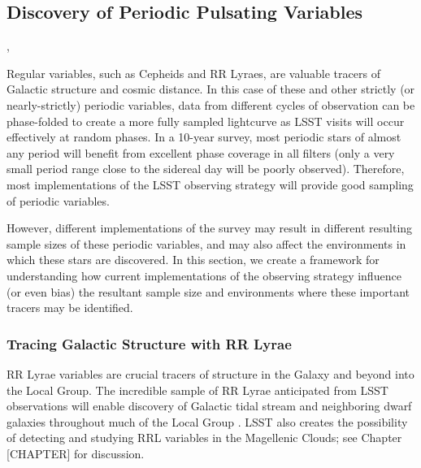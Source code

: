 
%
%
%

\subsection{Discovery of Periodic Pulsating Variables}
\def\secname{periodicvariables}\label{sec:\secname}

,

Regular variables, such as Cepheids and RR Lyraes, are valuable tracers
of Galactic structure and cosmic distance. In this case of these and
other strictly (or nearly-strictly) periodic variables, data from
different cycles of observation can be phase-folded to create a more
fully sampled lightcurve as LSST visits will occur effectively at random
phases. In a 10-year survey, most periodic stars of almost any period
will benefit from excellent phase coverage in all filters (only a very
small period range close to the sidereal day will be poorly observed).
Therefore, most implementations of the LSST observing strategy will
provide good sampling of periodic variables.

However, different implementations of the survey may result in different
resulting sample sizes of these periodic variables, and may also affect
the environments in which these stars are discovered. In this section,
we create a framework for understanding how current implementations of
the observing strategy influence (or even bias) the resultant sample
size and environments where these important tracers may be identified.

\subsubsection{Tracing Galactic Structure with RR Lyrae}

RR Lyrae variables are crucial tracers of structure in the Galaxy and beyond
into the Local Group. The incredible sample of RR Lyrae anticipated from LSST
observations will enable discovery of Galactic tidal stream and neighboring
dwarf galaxies throughout much of the Local Group
\citep{IvezicEtal2008}.  LSST also creates the possibility
of detecting and studying RRL variables in the Magellenic Clouds; see Chapter
[CHAPTER] for discussion.

